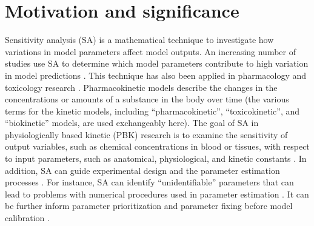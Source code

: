 \documentclass[preprint,12pt, a4paper]{elsarticle}
\begin{document}
\linenumbers


\newpage

\section{Motivation and significance}

Sensitivity analysis (SA) is a mathematical technique to investigate how variations in model parameters affect model outputs. An increasing number of studies use SA to determine which model parameters contribute to high variation in model predictions \cite{ferretti2016trends}. This technique has also been applied in pharmacology and toxicology research \cite{loizou2015application, mcnally2012reconstruction}. Pharmacokinetic models describe the changes in the concentrations or amounts of a substance in the body over time (the various terms for the kinetic models, including ``pharmacokinetic'', ``toxicokinetic'', and ``biokinetic'' models, are used exchangeably here). The goal of SA in physiologically based kinetic (PBK) research is to examine the sensitivity of output variables, such as chemical concentrations in blood or tissues, with respect to input parameters, such as anatomical, physiological, and kinetic constants \cite{mcnally2011workflow}. In addition, SA can guide experimental design and the parameter estimation processes \cite{zhang2015sobol}. For instance, SA can identify ``unidentifiable'' parameters that can lead to problems with numerical procedures used in parameter estimation \cite{chu2010quantitative}. It can be further inform parameter prioritization and parameter fixing before model calibration \cite{fphar201800588}.
\end{document}
